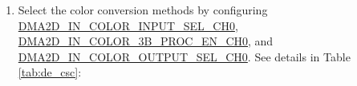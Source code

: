 \documentclass[main\_\_EN.tex]{subfiles}
\begin{document}
\begin{enumerate}
\begin{enumerate}
\begin{itemize}
            \item 0: BYTE2-1-0
            \item 1: BYTE2-0-1
            \item 2: BYTE1-0-2
            \item 3: BYTE1-2-0
            \item 4: BYTE0-2-1
            \item 5: BYTE0-1-2
        \end{itemize}
        Configuring \hyperref[fielddesc:DMA2DINSCRAMBLESELPRECH0]{DMA2D\_IN\_SCRAMBLE\_SEL\_PRE\_CH0} to 5 means swapping the pixel order, for example, swapping YUV444 output by the JPEG decoder to VUY444. Note that, this function is only available for 2D DMA RX channel0, not for any other RX channels.
        \item Select the color conversion methods by configuring \hyperref[fielddesc:DMA2DINCOLORINPUTSELCH0]{DMA2D\_IN\_COLOR\_INPUT\_SEL\_CH0}, \hyperref[fielddesc:DMA2DINCOLOR3BPROCENCH0]{DMA2D\_IN\_COLOR\_3B\_PROC\_EN\_CH0}, and \hyperref[fielddesc:DMA2DINCOLOROUTPUTSELCH0]{DMA2D\_IN\_COLOR\_OUTPUT\_SEL\_CH0}. See details in Table \ref{tab:de_csc}:


\end{enumerate}
\end{enumerate}
\end{document}

